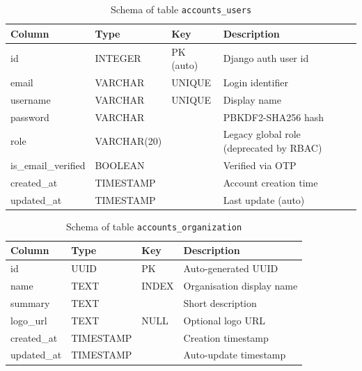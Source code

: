 \begin{table}[H]
\centering
\caption{Schema of table \texttt{accounts\_users}}\label{tab:schema_users}
\begin{tabularx}{\textwidth}{@{}l l l X@{}}
\toprule
\textbf{Column} & \textbf{Type} & \textbf{Key} & \textbf{Description}\\
\midrule
id              & INTEGER     & PK (auto) & Django auth user id\\
email           & VARCHAR     & UNIQUE    & Login identifier\\
username        & VARCHAR     & UNIQUE    & Display name\\
password        & VARCHAR     &           & PBKDF2-SHA256 hash\\
role            & VARCHAR(20) &           & Legacy global role (deprecated by RBAC)\\
is\_email\_verified & BOOLEAN &          & Verified via OTP\\
created\_at     & TIMESTAMP   &           & Account creation time\\
updated\_at     & TIMESTAMP   &           & Last update (auto)\\
\bottomrule
\end{tabularx}
\end{table}

\begin{table}[H]
\centering
\caption{Schema of table \texttt{accounts\_organization}}\label{tab:schema_org}
\begin{tabularx}{\textwidth}{@{}l l l X@{}}
\toprule
\textbf{Column} & \textbf{Type} & \textbf{Key} & \textbf{Description}\\
\midrule
id         & UUID    & PK & Auto-generated UUID\\
name       & TEXT    & INDEX & Organisation display name\\
summary    & TEXT    &     & Short description\\
logo\_url  & TEXT    & NULL & Optional logo URL\\
created\_at & TIMESTAMP & & Creation timestamp\\
updated\_at & TIMESTAMP & & Auto-update timestamp\\
\bottomrule
\end{tabularx}
\end{table}


